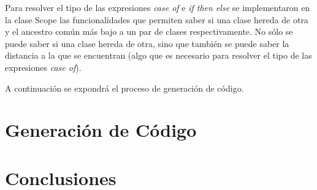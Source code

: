 \documentclass{article}
\begin{document}
	Para resolver el tipo de las expresiones \textit{case of} e \textit{if then else} se implementaron en la clase Scope las funcionalidades que permiten saber si una clase hereda de otra y el ancestro com\'un m\'as bajo a un par de clases respectivamente. No s\'olo se puede saber si una clase hereda de otra, sino que tambi\'en se puede saber la distancia a la que se encuentran (algo que es necesario para resolver el tipo de las expresiones \textit{case of}).
	
	A continuaci\'on se expondr\'a el proceso de generaci\'on de c\'odigo.
	
	\section{Generaci\'on de C\'odigo}
	\label{sec:code-gen}
	
	\section{Conclusiones}
	\label{sec:conclusions}
	  
\end{document}
